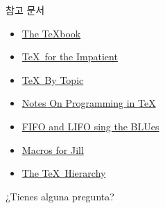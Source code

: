 \documentclass{beamer}
\begin{document}
%
\begin{frame}{참고 문서}
  \begin{itemize}
  \item \href{http://ftp.ktug.org/tex-archive/systems/knuth/dist/tex/}
    {The \TeX book}
  \item \href{http://ftp.ktug.org/tex-archive/info/impatient/book.pdf}
    {\TeX\ for the Impatient}
  \item \href{http://ftp.ktug.org/tex-archive/info/texbytopic/TeXbyTopic.pdf}
    {\TeX\ By Topic}
  \item \href{http://pgfplots.sourceforge.net/TeX-programming-notes.pdf}
    {Notes On Programming in TeX}
  \item \href{https://www.tug.org/TUGboat/tb14-1/tb38laan.pdf}
    {FIFO and LIFO sing the BLUes}
  \item \href{https://www.tug.org/TUGboat/tb08-3/tb19knut.pdf}
    {Macros for Jill}
  \item \href{https://www.tug.org/TUGboat/tb15-1/tb42arseneau.pdf}
    {The TeX\ Hierarchy}
  \end{itemize}
\end{frame}


%
\begin{frame}[standout]
  ¿Tienes alguna pregunta?
\end{frame}
\end{document}
